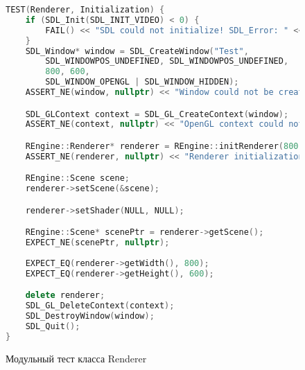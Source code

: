 \begin{figure}[ht]
\begin{lstlisting}[language=C++]
TEST(Renderer, Initialization) {
    if (SDL_Init(SDL_INIT_VIDEO) < 0) {
        FAIL() << "SDL could not initialize! SDL_Error: " << SDL_GetError();
    }
    SDL_Window* window = SDL_CreateWindow("Test", 
        SDL_WINDOWPOS_UNDEFINED, SDL_WINDOWPOS_UNDEFINED, 
        800, 600, 
        SDL_WINDOW_OPENGL | SDL_WINDOW_HIDDEN);
    ASSERT_NE(window, nullptr) << "Window could not be created!";

    SDL_GLContext context = SDL_GL_CreateContext(window);
    ASSERT_NE(context, nullptr) << "OpenGL context could not be created!";

    REngine::Renderer* renderer = REngine::initRenderer(800, 600);
    ASSERT_NE(renderer, nullptr) << "Renderer initialization failed";

    REngine::Scene scene;
    renderer->setScene(&scene);

    renderer->setShader(NULL, NULL);

    REngine::Scene* scenePtr = renderer->getScene();
    EXPECT_NE(scenePtr, nullptr);
    
    EXPECT_EQ(renderer->getWidth(), 800);
    EXPECT_EQ(renderer->getHeight(), 600);

    delete renderer;
    SDL_GL_DeleteContext(context);
    SDL_DestroyWindow(window);
    SDL_Quit();
}
\end{lstlisting}  
\caption{Модульный тест класса Renderer}
\label{unitRenderer:image}
\end{figure}

